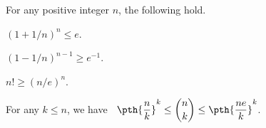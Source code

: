 \begin {lemma} For any positive integer $n$, the following hold. \smallskip \begin {compactenumi} \item $(1+1/n)^n \leq e$. \par \smallskip \item $(1-1/n)^{n-1} \geq e^{-1}$. \par \smallskip \item $n! \geq (n/e)^n$. \par \smallskip \item For any $k \leq n$, we have $\;\;\displaystyle \pth {\frac {n}{k}}^k \leq \binom {n}{k} \leq \pth {\frac {n e}{k}}^k$. \end {compactenumi} \par {} \end {lemma}
